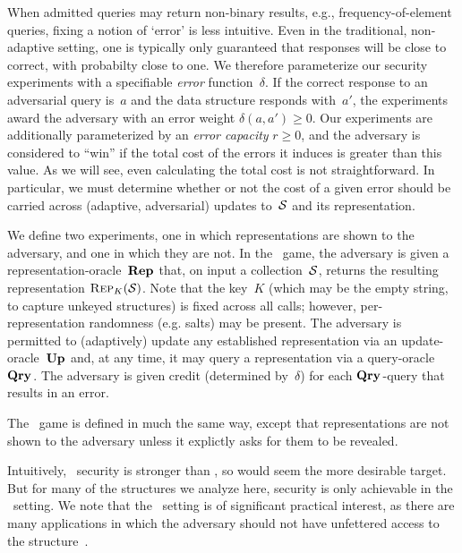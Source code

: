 When admitted queries may return non-binary results, e.g.,
frequency-of-element queries, fixing a notion of `error' is less
intuitive.  Even in the traditional, non-adaptive setting, one is
typically only guaranteed that responses will be close to correct,
with probabilty close to one. 
We therefore parameterize our security experiments with a specifiable
\emph{error} function~$\delta$.  If the correct response to an adversarial
query is~$a$ and the data structure responds with~$a'$, the
experiments award the adversary with an error weight $\delta(a,a') \geq 0$.
%
Our experiments are additionally parameterized by an \emph{error capacity}
$r\geq0$, and the adversary is considered to ``win'' if the total cost of the
errors it induces is greater than this value.  As we will see, even calculating
the total cost is not straightforward.  In particular, we must determine whether
or not the cost of a given error should be carried across (adaptive,
adversarial) updates to~$\mathcal{S}$ and its representation.

We define two experiments, one in which representations are shown to
the adversary, and one in which they are not.
%
In the \errep\ game, the adversary is given a
representation-oracle~$\textup{\textbf{Rep}}\hspace{0.5pt}$ that, on input a collection~$\mathcal{S}$,
returns the resulting representation $\textnormal{\textsc{Rep}}_K(\mathcal{S})$. Note that the
key~$K$ (which may be the empty string, to capture unkeyed structures)
is fixed across all calls; however, per-representation randomness
(e.g. salts) may be present.  The adversary is permitted to
(adaptively) update any established representation via an
update-oracle~$\textup{\textbf{Up}}\hspace{0.5pt}$ and, at any time, it may query a representation
via a query-oracle~$\textup{\textbf{Qry}}\hspace{0.5pt}$. The adversary is given credit (determined
by~$\delta$) for each $\textup{\textbf{Qry}}\hspace{0.5pt}$-query that results in an error.

The \erreps\ game is defined in much the same way, except that representations
are not shown to the adversary unless it explictly asks for them to be
revealed.

Intuitively, \errep\
security is stronger than \erreps, so would seem the more desirable
target.  But for many of the structures we analyze here, security is only achievable in
the \erreps\ setting.
%
We note that the \erreps\ setting is of significant practical interest, as there are many
applications in which the adversary should not have unfettered access to the
structure~\cite{gerbet2015power}.

